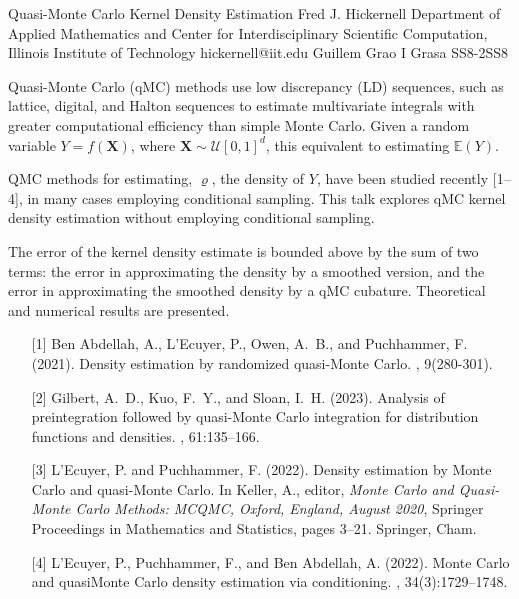 \begin{talk}
  {Quasi-Monte Carlo Kernel Density Estimation}%
  {Fred J. Hickernell}%
  {Department of Applied Mathematics and Center for Interdisciplinary Scientific Computation, Illinois Institute of Technology}%
  {hickernell@iit.edu}%
  {Guillem Grao I Grasa}%
{}{}{SS8-2}{SS8}

			
Quasi-Monte Carlo (qMC) methods use low discrepancy (LD) sequences, such as lattice, digital, and Halton sequences to estimate multivariate integrals with greater computational efficiency than simple Monte Carlo.  Given a random variable $Y = f(\boldsymbol{X})$, where $\boldsymbol{X} \sim \mathcal{U}[0,1]^d$, this equivalent to estimating $\mathbb{E}(Y)$.

QMC methods for estimating, $\varrho$, the density of $Y$, have been studied recently %
[1--4], in many cases employing conditional sampling.
This talk explores qMC kernel density estimation without employing conditional sampling.  

The error of the kernel density estimate is bounded above by the sum of two terms:  the error in approximating the density by a smoothed version, and the error in approximating the smoothed density by a qMC cubature.   Theoretical and numerical results are presented.

\medskip

\begin{enumerate}
	\item[{[1]}]
{Ben Abdellah}, A., L'Ecuyer, P., Owen, A.~B., and Puchhammer, F. (2021).
\newblock Density estimation by randomized quasi-{M}onte {C}arlo.
, 9(280-301).

\item[{[2]}]
Gilbert, A.~D., Kuo, F.~Y., and Sloan, I.~H. (2023).
\newblock Analysis of preintegration followed by quasi-{M}onte {C}arlo integration for distribution functions and densities.
, 61:135--166.

\item[{[3]}]
L'Ecuyer, P. and Puchhammer, F. (2022).
\newblock Density estimation by {M}onte {C}arlo and quasi-{M}onte {C}arlo.
\newblock In Keller, A., editor, {\em {M}onte {C}arlo and Quasi-{M}onte {C}arlo Methods: {MCQMC}, {O}xford, England, {A}ugust 2020}, Springer Proceedings in Mathematics and Statistics, pages 3--21. Springer, Cham.

\item[{[4]}]
L'Ecuyer, P., Puchhammer, F., and {Ben Abdellah}, A. (2022).
\newblock Monte Carlo and quasi{\textendash}{M}onte {C}arlo density estimation via conditioning.
, 34(3):1729--1748.
\end{enumerate}


\end{talk}

